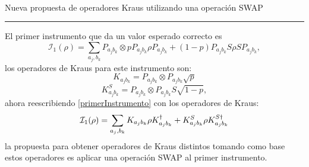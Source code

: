 \documentclass[12pt,oneside]{book}\raggedbottom{}
\begin{document}
\theoremstyle{Tema} \newtheorem{Tema}{Tema} %
\theoremstyle{Tema} \newtheorem{serie}{Serie}              %
\theoremstyle{Tema} \newtheorem{ejercicio}{Ejercicio}    %


{
\renewcommand{\headrulewidth}{1.5pt}
\fancyhead[R]{
			}
\fancyhead[L]{ 
	}
}

{
\renewcommand{\headrulewidth}{0.8 pt}
\fancyhead[R]{
			\emph{\myName{} $-$ \myCourse{}} %
			}
\fancyhead[L]{}  
\fancyfoot[C]{}
\fancyfoot[R]{\thepage}
}

\date{}
\setlength{\headheight}{0.5in} %

\pagestyle{allStyle}

\thispagestyle{firststyle}
\begin{center}
\LARGE
\textsc{\myName}\\\normalsize Nueva propuesta de operadores Kraus utilizando una operación SWAP %
\medskip
\hrule height 1.5pt
\end{center}

El primer instrumento que da un valor esperado correcto es \begin{equation}\label{primerInstrumento}
	\mathcal{I}_1(\rho)=\sum_{a_j,b_k} P_{a_j b_k}\otimes p P_{a_j b_k}\rho  P_{a_j b_k}+ (1-p) P_{a_j b_k}S\rho S  P_{a_j b_k},
\end{equation} los operadores de Kraus para este instrumento son:\[K_{a_j b_k}= P_{a_j b_k}\otimes  P_{a_j b_k}\sqrt{p} \] \[K_{a_j b_k}^S= P_{a_j b_k}\otimes  P_{a_j b_k}S\sqrt{1-p}, \]
ahora reescribiendo {\ref{primerInstrumento}} con los operadores de Kraus:\[\mathcal{I}_1(\rho)=\sum_{a_j,b_k}K_{a_j b_k}\rho K_{a_j b_k}^\dagger+K_{a_j b_k}^S\rho K_{a_j b_k}^{S\dagger}\]
la propuesta para obtener operadores de Kraus distintos tomando como base estos operadores es aplicar una operación SWAP al primer instrumento.
\end{document}
